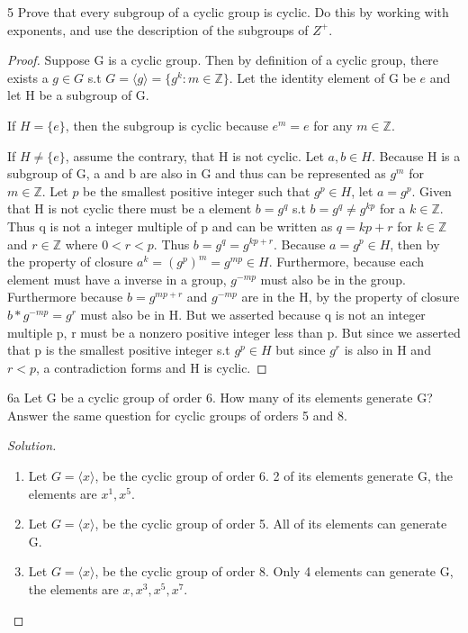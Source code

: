 \documentclass{article}
\newcommand{\Z}{\mathbb{Z}}
\newenvironment{solution}
{\renewcommand\qedsymbol{$\blacksquare$}\begin{proof}[Solution]}
{\end{proof}}
\begin{document}
\begin{claim}{5}
    Prove that every subgroup of a cyclic group is cyclic. Do this by working with exponents, and use the description of the subgroups of $Z^+$.
\end{claim}
\begin{proof}
    Suppose G is a cyclic group. Then by definition of a cyclic group, there exists a $g \in G$ s.t $G = \langle g \rangle = \{g^k : m \in \Z \}$. Let the identity element of G be $e$ and let H be a subgroup of G.

    If $H = \{e\}$, then the subgroup is cyclic because $e^m = e$ for any $m \in \Z.$
    
    If $H \neq \{e\}$, assume the contrary, that H is not cyclic. Let $a, b \in H$. Because H is a subgroup of G, a and b are also in G and thus can be represented as $g^m$ for $m \in \Z$. Let $p$ be the smallest positive integer such that $g^p \in H$, let $a = g^p$. Given that H is not cyclic there must be a element $b = g^q$ s.t $b = g^q \neq g^{kp}$ for a $k \in \Z$. Thus q is not a integer multiple of p and can be written as $q = kp + r$ for $k \in \Z$ and $r \in \Z$ where $0 < r < p$. Thus $b = g^q = g^{kp + r}$. Because $a = g^p \in H$, then by the property of closure $a^k = (g^p)^m = g^{mp} \in H$. Furthermore, because each element must have a inverse in a group, $g^{-mp}$ must also be in the group. Furthermore because $b = g^{mp + r}$ and $g^{-mp}$ are in the H, by the property of closure $b \ast g^{-mp} = g^r$ must also be in H. But we asserted because q is not an integer multiple p, r must be a nonzero positive integer less than p. But since we asserted that p is the smallest positive integer s.t $g^p \in H$ but since $g^r$ is also in H and $r < p$, a contradiction forms and H is cyclic.
\end{proof}

\bigskip

\begin{PROB}{6a}\label{Problem 6a.}
    Let G be a cyclic group of order 6. How many of its elements generate G? Answer the same question for cyclic groups of orders 5 and 8.
\end{PROB}
\begin{solution}
    \begin{enumerate}{}
        \item Let $G = \langle x \rangle$, be the cyclic group of order 6. 2 of its elements generate G, the elements are $x^1, x^5$.
        \item Let $G = \langle x \rangle$, be the cyclic group of order 5. All of its elements can generate G.
        \item Let $G = \langle x \rangle$, be the cyclic group of order 8. Only 4 elements can generate G, the elements are $x, x^3, x^5, x^7$.
    \end{enumerate}
\end{solution}
\end{document}
